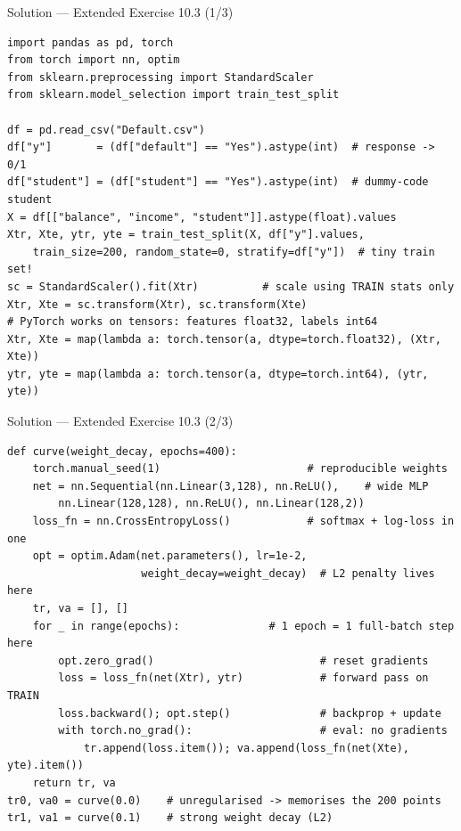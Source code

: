\documentclass[aspectratio=169,11pt]{beamer}
\begin{document}
\begin{frame}[fragile]{Solution --- Extended Exercise 10.3 (1/3)}
\begin{solutionbox}
\begin{lstlisting}[basicstyle=\ttfamily\scriptsize]
import pandas as pd, torch
from torch import nn, optim
from sklearn.preprocessing import StandardScaler
from sklearn.model_selection import train_test_split

df = pd.read_csv("Default.csv")
df["y"]       = (df["default"] == "Yes").astype(int)  # response -> 0/1
df["student"] = (df["student"] == "Yes").astype(int)  # dummy-code student
X = df[["balance", "income", "student"]].astype(float).values
Xtr, Xte, ytr, yte = train_test_split(X, df["y"].values,
    train_size=200, random_state=0, stratify=df["y"])  # tiny train set!
sc = StandardScaler().fit(Xtr)          # scale using TRAIN stats only
Xtr, Xte = sc.transform(Xtr), sc.transform(Xte)
# PyTorch works on tensors: features float32, labels int64
Xtr, Xte = map(lambda a: torch.tensor(a, dtype=torch.float32), (Xtr, Xte))
ytr, yte = map(lambda a: torch.tensor(a, dtype=torch.int64), (ytr, yte))
\end{lstlisting}
\end{solutionbox}
\end{frame}

\begin{frame}[fragile]{Solution --- Extended Exercise 10.3 (2/3)}
\begin{solutionbox}
\begin{lstlisting}[basicstyle=\ttfamily\scriptsize\linespread{0.88}\selectfont]
def curve(weight_decay, epochs=400):
    torch.manual_seed(1)                       # reproducible weights
    net = nn.Sequential(nn.Linear(3,128), nn.ReLU(),    # wide MLP
        nn.Linear(128,128), nn.ReLU(), nn.Linear(128,2))
    loss_fn = nn.CrossEntropyLoss()            # softmax + log-loss in one
    opt = optim.Adam(net.parameters(), lr=1e-2,
                     weight_decay=weight_decay)  # L2 penalty lives here
    tr, va = [], []
    for _ in range(epochs):              # 1 epoch = 1 full-batch step here
        opt.zero_grad()                          # reset gradients
        loss = loss_fn(net(Xtr), ytr)            # forward pass on TRAIN
        loss.backward(); opt.step()              # backprop + update
        with torch.no_grad():                    # eval: no gradients
            tr.append(loss.item()); va.append(loss_fn(net(Xte), yte).item())
    return tr, va
tr0, va0 = curve(0.0)    # unregularised -> memorises the 200 points
tr1, va1 = curve(0.1)    # strong weight decay (L2)
\end{lstlisting}
\end{solutionbox}
\end{frame}
\end{document}
